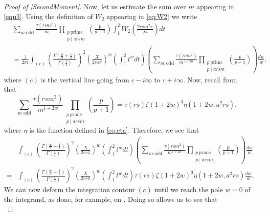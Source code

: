 \documentclass[10pt,a4paper]{amsart}
\theoremstyle{plain}
\theoremstyle{definition}
\theoremstyle{remark}
\begin{document}
\begin{proof}[Proof of \cref{SecondMoment}]
Now, let us estimate the sum over $m$ appearing in \eqref{equ3}. Using the definition of $W_2$ appearing in \eqref{eq:W2} we write
\begin{equation}\label{equint}
\begin{aligned}
    &\sum_{m \text{ odd}}\frac{\tau(rsm^2)}{m}\prod_{\substack{p \ \text{prime} \\ p\mid arsm}}\left(\frac{p}{p+1}\right)\int_1^2 W_2\left(\frac{2rsm^2\pi}{Xt}\right)dt \\ &=
\frac{1}{2\pi i}\int_{(c)}\left(\frac{\Gamma(\frac{w}{2}+\frac{1}{4})}{\Gamma(\frac{1}{4})}\right)^2\left(\frac{X}{2rs\pi}\right)^w\left(\int_{1}^{2}t^wdt\right) \left( \sum_{m\text{ odd}}\frac{\tau(rsm^2)}{m^{1+2w}}\prod_{\substack{p \ \text{prime} \\ p\mid arsm}}\left(\frac{p}{p+1}\right) \right) \frac{dw}{w},
\end{aligned}
\end{equation}
where $(c)$ is the vertical line going from $c-i\infty$ to $c+i\infty$.
Now, recall from \cite[Lemma 5.1]{Soundararajan_2000} that
\begin{equation}\label{Sound Lemma 5.1}
\sum_{m \text{ odd}} \frac{\tau(r s m^2)}{m^{1+2w}} \prod_{\substack{p \ \text{prime} \\p \mid a r s m}} \left(\frac{p}{p+1}\right) = \tau(rs) \zeta(1 + 2 w)^3 \eta(1+2w,a^2 r s),
\end{equation}
where $\eta$ is the function defined in \eqref{eq:eta}.
Therefore, we see that
\begin{equation}\label{equint2}
\begin{aligned}
    &\int_{(c)}\left(\frac{\Gamma(\frac{w}{2}+\frac{1}{4})}{\Gamma(\frac{1}{4})}\right)^2\left(\frac{X}{2rs\pi}\right)^w\left(\int_{1}^{2}t^wdt\right) \left( \sum_{m\text{ odd}}\frac{\tau(rsm^2)}{m^{1+2w}}\prod_{\substack{p \ \text{prime} \\ p\mid arsm}}\left(\frac{p}{p+1}\right) \right) \frac{dw}{w} \\
    = &\int_{(c)}\left(\frac{\Gamma(\frac{w}{2}+\frac{1}{4})}{\Gamma(\frac{1}{4})}\right)^2\left(\frac{X}{2rs\pi}\right)^w\left(\int_{1}^{2}t^wdt\right)\tau(rs)\zeta(1+2w)^3\eta(1+2w,a^2rs)\frac{dw}{w}.
\end{aligned}
\end{equation}
We can now deform the integration contour $(c)$ until we reach the pole $w = 0$ of the integrand, as done, for example, on \cite[Page 465]{Soundararajan_2000}. Doing so allows us to see that
\begin{equation} \label{eq:residue}

\end{equation}
\end{proof}
\end{document}
